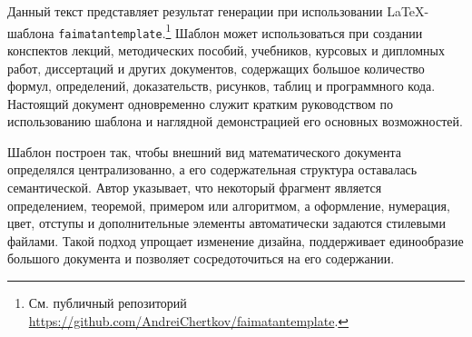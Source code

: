 Данный текст представляет результат генерации при использовании \LaTeX-шаблона \texttt{faimatantemplate}.\footnote{
    См. публичный репозиторий \url{https://github.com/AndreiChertkov/faimatantemplate}.
}
Шаблон может использоваться при создании конспектов лекций, методических пособий, учебников, курсовых и дипломных работ, диссертаций и других документов, содержащих большое количество формул, определений, доказательств, рисунков, таблиц и программного кода.
Настоящий документ одновременно служит кратким руководством по использованию шаблона и наглядной демонстрацией его основных возможностей.

Шаблон построен так, чтобы внешний вид математического документа определялся централизованно, а его содержательная структура оставалась семантической.
Автор указывает, что некоторый фрагмент является определением, теоремой, примером или алгоритмом, а оформление, нумерация, цвет, отступы и дополнительные элементы автоматически задаются стилевыми файлами.
Такой подход упрощает изменение дизайна, поддерживает единообразие большого документа и позволяет сосредоточиться на его содержании.

